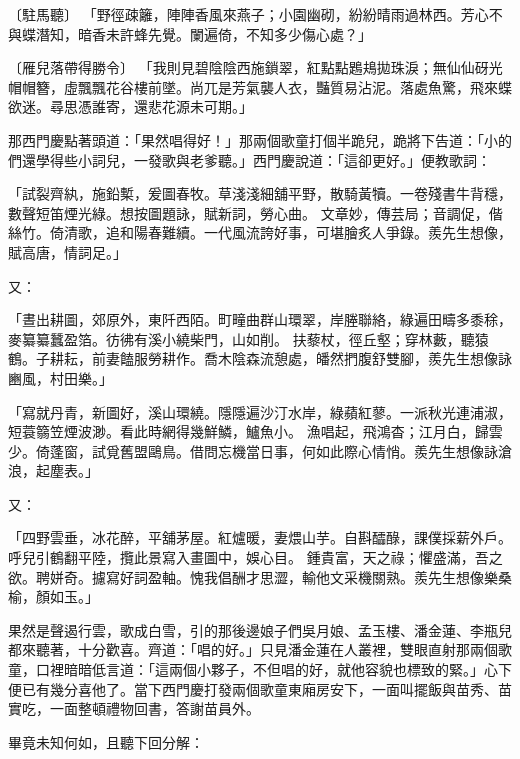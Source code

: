 〔駐馬聽〕  「野徑疎籬，陣陣香風來燕子；小園幽砌，紛紛晴雨過林西。芳心不與蝶潛知，暗香未許蜂先覺。闌遍倚，不知多少傷心處？」

〔雁兒落帶得勝令〕  「我則見碧陰陰西施鎖翠，紅點點鶗鳺拋珠淚；無仙仙砑光帽帽簪，虛飄飄花谷樓前墜。尚兀是芳氣襲人衣，豔質易沾泥。落處魚驚，飛來蝶欲迷。尋思憑誰寄，還悲花源未可期。」

那西門慶點著頭道：「果然唱得好！」那兩個歌童打個半跪兒，跪將下告道：「小的們還學得些小詞兒，一發歌與老爹聽。」西門慶說道：「這卻更好。」便教歌詞：

「試裂齊紈，施鉛槧，爰圖春牧。草淺淺細舖平野，散騎黃犢。一卷殘書牛背穩，數聲短笛煙光綠。想按圖題詠，賦新詞，勞心曲。  文章妙，傳芸局；音調促，偕絲竹。倚清歌，追和陽春難續。一代風流誇好事，可堪膾炙人爭錄。羨先生想像，賦高唐，情詞足。」

又：

「晝出耕圖，郊原外，東阡西陌。町疃曲群山環翠，岸塍聯絡，綠遍田疇多黍稌，麥纂纂蠶盈箔。彷彿有溪小繞柴門，山如削。  扶藜杖，徑丘壑；穿林藪，聽猿鶴。子耕耘，前妻饁服勞耕作。喬木陰森流憩處，皤然捫腹舒雙腳，羨先生想像詠豳風，村田樂。」

「寫就丹青，新圖好，溪山環繞。隱隱遍沙汀水岸，綠蘋紅蓼。一派秋光連浦淑，短蓑篛笠煙波渺。看此時網得幾鮮鱗，鱸魚小。  漁唱起，飛鴻杳；江月白，歸雲少。倚蓬窗，試覓舊盟鷗鳥。借問忘機當日事，何如此際心情悄。羨先生想像詠滄浪，起塵表。」

又：

「四野雲垂，冰花醉，平舖茅屋。紅爐暖，妻煨山芋。自斟醽醁，課僕採薪外戶。呼兒引鶴翻平陸，攬此景寫入畫圖中，娛心目。  鍾貴富，天之祿；懼盛滿，吾之欲。聘姘奇。攄寫好詞盈軸。愧我倡酬才思澀，輸他文采機關熟。羨先生想像樂桑榆，顏如玉。」

果然是聲遏行雲，歌成白雪，引的那後邊娘子們吳月娘、孟玉樓、潘金蓮、李瓶兒都來聽著，十分歡喜。齊道：「唱的好。」只見潘金蓮在人叢裡，雙眼直射那兩個歌童，口裡暗暗低言道：「這兩個小夥子，不但唱的好，就他容貌也標致的緊。」心下便已有幾分喜他了。當下西門慶打發兩個歌童東廂房安下，一面叫擺飯與苗秀、苗實吃，一面整頓禮物回書，答謝苗員外。

畢竟未知何如，且聽下回分解：
